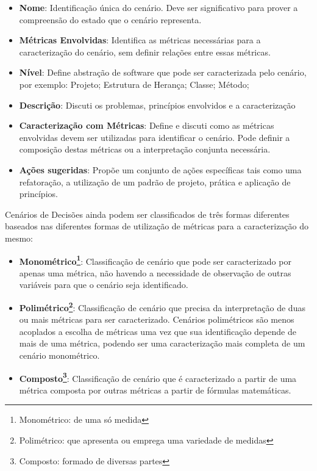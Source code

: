 \begin{itemize}
\item \textbf{Nome}: Identificação única do cenário. Deve ser significativo para prover a compreensão do estado que o cenário representa.

\item \textbf{Métricas Envolvidas}: Identifica as métricas necessárias para a caracterização do cenário, sem definir relações entre essas métricas.

\item \textbf{Nível}: Define abstração de software que pode ser caracterizada pelo cenário, por exemplo: Projeto; Estrutura de Herança; Classe; Método;

\item \textbf{Descrição}: Discuti os problemas, princípios envolvidos e a caracterização

\item \textbf{Caracterização com Métricas}: Define e discuti como as métricas envolvidas devem ser utilizadas para identificar o cenário. Pode definir a composição destas métricas ou a interpretação conjunta necessária.

\item \textbf{Ações sugeridas}: Propõe um conjunto de ações específicas tais como uma refatoração, a utilização de um padrão de projeto, prática e aplicação de princípios.
\end{itemize}

Cenários de Decisões ainda podem ser classificados de três formas diferentes baseados nas diferentes formas de utilização de métricas para a caracterização do mesmo:

\begin{itemize}
\item \textbf{Monométrico\footnote{Monométrico: de uma só medida}}: Classificação de cenário que pode ser caracterizado por apenas uma métrica, não havendo a necessidade de observação de outras variáveis para que o cenário seja identificado.

\item \textbf{Polimétrico\footnote{Polimétrico: que apresenta ou emprega uma variedade de medidas}}: Classificação de cenário que precisa da interpretação de duas ou mais métricas para ser caracterizado. Cenários polimétricos são menos acoplados a escolha de métricas uma vez que sua identificação depende de mais de uma métrica, podendo ser uma caracterização mais completa de um cenário monométrico. 

\item \textbf{Composto\footnote{Composto: formado de diversas partes}}: Classificação de cenário que é caracterizado a partir de uma métrica composta por outras métricas a partir de fórmulas matemáticas.
\end{itemize}

